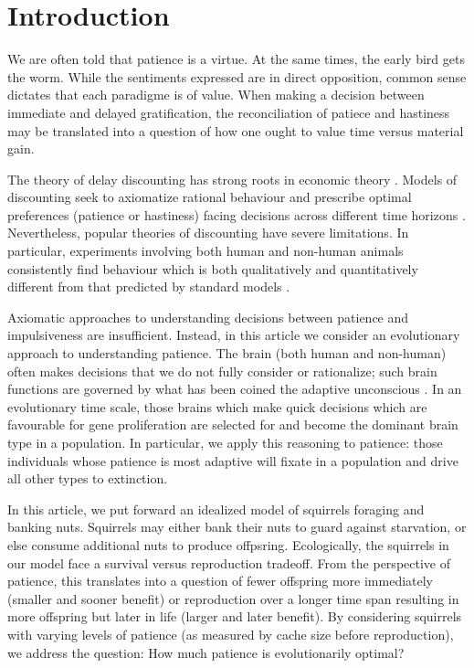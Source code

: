 \documentclass[titlepage, hidelinks, 12pt]{article}
\theoremstyle{plain}
\theoremstyle{remark}
\theoremstyle{definition}
\begin{document}
\section{Introduction}
We are often told that patience is a virtue. At the same times, the early bird gets the worm. 
While the sentiments expressed are in direct opposition, common sense dictates that each paradigme is of value. 
When making a decision between immediate and delayed gratification, the reconciliation of patiece and hastiness
may be translated into a question of how one ought to value time versus material gain. 

The theory of delay discounting has strong roots in economic theory \cite{sozou98, fedus19}. Models of discounting seek to axiomatize rational
behaviour and prescribe optimal preferences (patience or hastiness) facing decisions across different time horizons \cite{mazur97, ainslie75, green81}. 
Nevertheless, popular theories of discounting have severe limitations. In particular, experiments involving both human and non-human animals 
consistently find behaviour which is both qualitatively and quantitatively different from that predicted by standard 
models \cite{maia09, green04, frederick02}.

Axiomatic approaches to understanding decisions between patience and impulsiveness are insufficient. Instead, in this article we consider
an evolutionary approach to understanding patience. The brain (both human and non-human) often makes decisions that we do not fully consider
or rationalize; such brain functions are governed by what has been coined the adaptive unconscious \cite{wegner02}. In an evolutionary time scale,
those brains which make quick decisions which are favourable for gene proliferation are selected for and become the dominant brain type in a population.
In particular, we apply this reasoning to patience: those individuals whose patience is most adaptive will fixate in a population and drive all other
types to extinction.

In this article, we put forward an idealized model of squirrels foraging and banking nuts. Squirrels may either bank their nuts to guard against
starvation, or else consume additional nuts to produce offpsring. Ecologically, the squirrels in our model face a survival versus reproduction
tradeoff. From the perspective of patience, this translates into a question of fewer offspring more immediately (smaller and sooner benefit) 
or reproduction over a longer time span resulting in more offspring but later in life (larger and later benefit). By considering squirrels with
varying levels of patience (as measured by cache size before reproduction), we address the question: How much patience is evolutionarily optimal?
\end{document}
